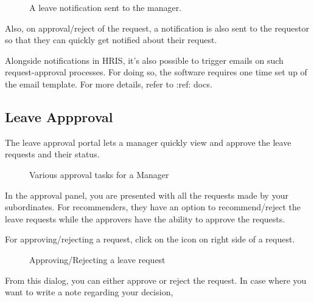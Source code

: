 \documentclass[letterpaper,10pt,english]{sphinxmanual}
\begin{document}
\begin{figure}[htbp]
\centering
\capstart

\noindent{}
\caption{A leave notification sent to the manager.}\label{\detokenize{manager/manager-approval:id5}}\end{figure}

Also, on approval/reject of the request, a  notification is also sent to the requestor so that they can quickly get notified about their request.

Alongside notifications in HRIS, it’s also possible to trigger emails on such request-approval processes. For doing so, the software requires one time set up of the email template. For more details, refer to :ref:  docs.


\subsection{Leave Appproval}
\label{\detokenize{manager/manager-approval:leave-appproval}}
The leave approval portal lets a manager quickly view and approve the leave requests and their status.

\begin{figure}[htbp]
\centering
\capstart

\noindent{}
\caption{Various approval tasks for a Manager}\label{\detokenize{manager/manager-approval:id6}}\end{figure}

In the approval panel, you are presented with all the requests made by your subordinates. For recommenders, they have an option to recommend/reject the leave requests while the approvers have the ability to approve the requests.

For approving/rejecting a request, click on the \sphinxstyleemphasis{} icon on right side of a request.

\begin{figure}[htbp]
\centering
\capstart

\noindent{}
\caption{Approving/Rejecting a leave request}\label{\detokenize{manager/manager-approval:id7}}\end{figure}

From this dialog, you can either approve or reject the request. In case where you want to write a note regarding your decision,
\end{document}

